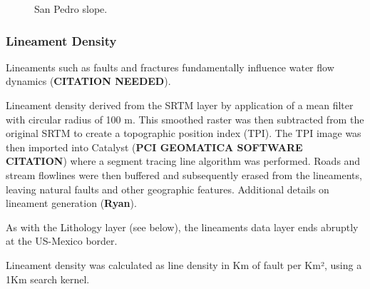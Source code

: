 \documentclass[
]{agujournal2019}
\begin{document}
\begin{figure}
{}

\caption{\label{fig-slope}San Pedro slope.}

\end{figure}%

\subsubsection{Lineament Density}\label{lineament-density}

Lineaments such as faults and fractures fundamentally influence water
flow dynamics (\textbf{CITATION NEEDED}).

Lineament density derived from the SRTM layer by application of a mean
filter with circular radius of 100 m. This smoothed raster was then
subtracted from the original SRTM to create a topographic position index
(TPI). The TPI image was then imported into Catalyst (\textbf{PCI
GEOMATICA SOFTWARE CITATION}) where a segment tracing line algorithm was
performed. Roads and stream flowlines were then buffered and
subsequently erased from the lineaments, leaving natural faults and
other geographic features. Additional details on lineament generation
(\textbf{Ryan}).

As with the Lithology layer (see below), the lineaments data layer ends
abruptly at the US-Mexico border.

Lineament density was calculated as line density in Km of fault per Km²,
using a 1Km search kernel.
\end{document}
